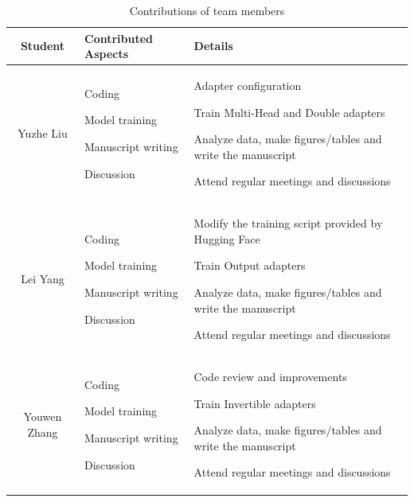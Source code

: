 \documentclass[conference]{IEEEtran}
\begin{document}
\begin{table}[h]
    \centering
    \caption{Contributions of team members }
    \label{tab:t5}
    \begin{tabular}{|c|p{3cm}|p{4cm}|}
        \hline
        Student & Contributed Aspects & Details \\
        \hline
        Yuzhe Liu & Coding 

Model training 

Manuscript writing 

Discussion & Adapter configuration 

Train Multi-Head and Double adapters 

Analyze data, make figures/tables and write the manuscript 

Attend regular meetings and discussions \\
        \hline
        Lei Yang & Coding 

Model training 

Manuscript writing 

Discussion & Modify the training script provided by Hugging Face 

Train Output adapters 

Analyze data, make figures/tables and write the manuscript 

Attend regular meetings and discussions\\
        \hline
        Youwen Zhang & Coding 

Model training 

Manuscript writing 

Discussion & Code review and improvements 

Train Invertible adapters 

Analyze data, make figures/tables and write the manuscript 

Attend regular meetings and discussions\\
        \hline
    \end{tabular}
\end{table}
\end{document}
